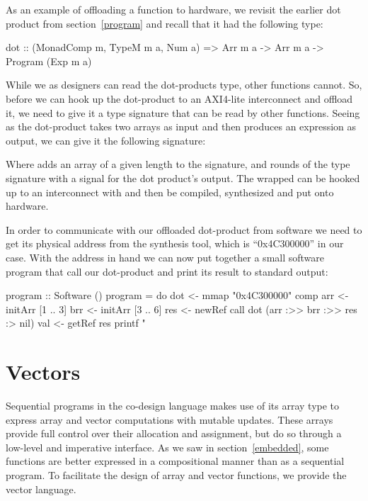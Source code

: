 \documentclass[../paper.tex]{subfiles}
\begin{document}
As an example of offloading a function to hardware, we revisit the earlier dot product from section~\ref{program} and recall that it had the following type:

\begin{code}
dot :: (MonadComp m, TypeM m a, Num a) => Arr m a -> Arr m a
  -> Program (Exp m a)
\end{code}

\noindent While we as designers can read the dot-products type, other functions cannot. So, before we can hook up the dot-product to an AXI4-lite interconnect and offload it, we need to give it a type signature that can be read by other functions. Seeing as the dot-product takes two arrays as input and then produces an expression as output, we can give it the following signature:


\noindent Where  adds an array of a given length to the signature, and  rounds of the type signature with a signal for the dot product's output. The wrapped  can be hooked up to an interconnect with  and then be compiled, synthesized and put onto hardware.

In order to communicate with our offloaded dot-product from software we need to get its physical address from the synthesis tool, which is ``0x4C300000'' in our case. With the address in hand we can now put together a small software program that call our dot-product and print its result to standard output:

\begin{code}
program :: Software ()
program = do
  dot <- mmap "0x4C300000" comp
  arr <- initArr [1 .. 3]
  brr <- initArr [3 .. 6]
  res <- newRef
  call dot (arr :>> brr :>> res :> nil)
  val <- getRef res
  printf "%
\end{code}

\section{Vectors}
\label{vectors}

Sequential programs in the co-design language makes use of its array type to express array and vector computations with mutable updates. These arrays provide full control over their allocation and assignment, but do so through a low-level and imperative interface. As we saw in section~\ref{embedded}, some functions are better expressed in a compositional manner than as a sequential program. To facilitate the design of array and vector functions, we provide the vector language. 
\end{document}
